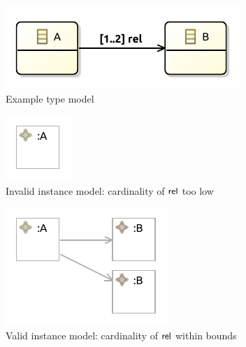 \begin{figure}
    \centering
    \begin{subfigure}{\textwidth}
        \centering
        \includegraphics{images/03_formalisations/02_ecore_formalisation/multiplicities/type_model.pdf}
        \caption{Example type model}
        \label{fig:formalisations:ecore_formalisation:instance_models:multiplicity_example:type_model}
    \end{subfigure}
    
    \begin{subfigure}{0.3\textwidth}
        \centering
        \includegraphics{images/03_formalisations/02_ecore_formalisation/multiplicities/invalid_lower.pdf}
        \caption{Invalid instance model: cardinality of $\mathsf{rel}$ too low}
        \label{fig:formalisations:ecore_formalisation:instance_models:multiplicity_example:invalid_lower}
    \end{subfigure}
    \begin{subfigure}{0.3\textwidth}
        \centering
        \includegraphics{images/03_formalisations/02_ecore_formalisation/multiplicities/valid.pdf}
        \caption{Valid instance model: cardinality of $\mathsf{rel}$ within bounds}
        \label{fig:formalisations:ecore_formalisation:instance_models:multiplicity_example:valid}
    \end{subfigure}
    \begin{subfigure}{0.3\textwidth}
        \centering

\end{subfigure}
\end{figure}
